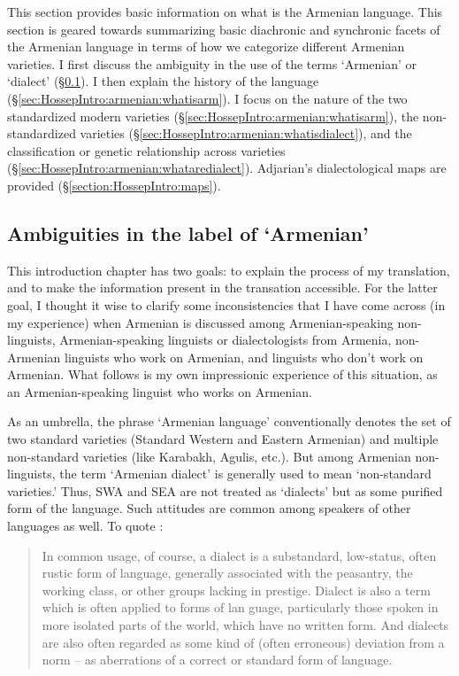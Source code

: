 This section provides basic information on what is the Armenian language. This section is geared towards summarizing basic diachronic and synchronic facets of the Armenian language in terms of how we categorize different Armenian varieties. I first discuss the ambiguity in the use of the terms `Armenian' or `dialect' (\S\ref{sec:HossepIntro:armenian:ambiguity}). I then explain the history of the language (\S\ref{sec:HossepIntro:armenian:whatisarm}). I   focus on the nature of the two standardized modern varieties  (\S\ref{sec:HossepIntro:armenian:whatisarm}), the non-standardized varieties (\S\ref{sec:HossepIntro:armenian:whatisdialect}), and the classification or genetic relationship across   varieties (\S\ref{sec:HossepIntro:armenian:whataredialect}). Adjarian's dialectological maps are provided   (\S\ref{section:HossepIntro:maps}).  

\subsection{Ambiguities in the label of `Armenian'}\label{sec:HossepIntro:armenian:ambiguity}



This introduction chapter has two goals: to explain the process of my translation, and to make the information present in the transation  accessible. For the latter goal, I thought it wise to clarify some inconsistencies that I have come across (in my experience) when Armenian is discussed among Armenian-speaking non-linguists, Armenian-speaking linguists or dialectologists from Armenia, non-Armenian linguists who work on Armenian, and linguists who don't work on Armenian. What follows is my own impressionic experience of this situation, as an Armenian-speaking linguist who works on Armenian.

As an umbrella, the phrase `Armenian language' conventionally denotes the set of two standard varieties (Standard Western and Eastern Armenian) and multiple non-standard varieties (like Karabakh, Agulis, etc.). But among Armenian non-linguists, the term `Armenian dialect' is generally used to mean `non-standard varieties.'  Thus, SWA and SEA are not treated as `dialects' but as some purified form of the language. Such attitudes are common among speakers of other languages as well. To quote \citet[3]{ChambersTrudgill-1998-Dialectology}:


\begin{quote}
	In common usage, of course, a dialect is a substandard, low-status, often rustic form of language, generally associated with the peasantry, the working class, or other groups lacking in prestige. Dialect is also a term which is often applied to forms of lan guage, particularly those spoken in more isolated parts of the world, which have no written form. And dialects are also often regarded as some kind of (often erroneous) deviation from a norm – as aberrations of a correct or standard form of language.
\end{quote}


